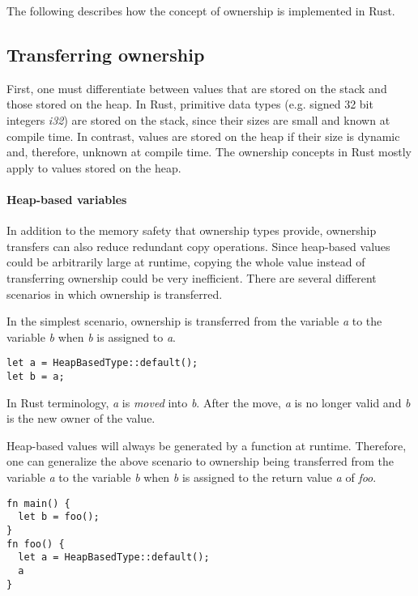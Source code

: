 \documentclass[sigplan,11pt,nonacm]{acmart}
\begin{document}
The following describes how the concept of ownership is implemented in Rust.

\subsection{Transferring ownership}

First, one must differentiate between values that are stored on the stack and those stored on the heap.
In Rust, primitive data types (e.g. signed 32 bit integers \emph{i32}) are stored on the stack, since their sizes are small and known at compile time.
In contrast, values are stored on the heap if their size is dynamic and, therefore, unknown at compile time.
The ownership concepts in Rust mostly apply to values stored on the heap.

\paragraph{Heap-based variables}

In addition to the memory safety that ownership types provide, ownership transfers can also reduce redundant copy operations.
Since heap-based values could be arbitrarily large at runtime, copying the whole value instead of transferring ownership could be very inefficient.
There are several different scenarios in which ownership is transferred.

In the simplest scenario, ownership is transferred from the variable \emph{a} to the variable \emph{b} when \emph{b} is assigned to \emph{a}.
\begin{lstlisting}
let a = HeapBasedType::default();
let b = a;
\end{lstlisting}
In Rust terminology, \emph{a} is \emph{moved} into \emph{b}.
After the move, \emph{a} is no longer valid and \emph{b} is the new owner of the value.

Heap-based values will always be generated by a function at runtime.
Therefore, one can generalize the above scenario to ownership being transferred from the variable \emph{a} to the variable \emph{b} when \emph{b} is assigned to the return value \emph{a} of \emph{foo}.
\begin{lstlisting}
fn main() {
  let b = foo();
}
fn foo() {
  let a = HeapBasedType::default();
  a
}
\end{lstlisting}
\end{document}
